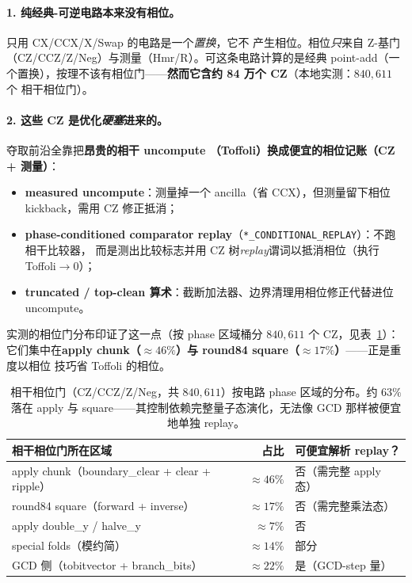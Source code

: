 \documentclass[11pt]{ctexart}
\let\c\lstinline
\begin{document}
\paragraph{1. 纯经典-可逆电路本来没有相位。}只用 CX/CCX/X/Swap 的电路是一个\emph{置换}，它不
产生相位。相位\emph{只}来自 Z-基门（CZ/CCZ/Z/Neg）与测量（Hmr/R）。可这条电路计算的是经典
point-add（一个置换），按理不该有相位门——\textbf{然而它含约 84 万个 CZ}（本地实测：$840{,}611$ 个
相干相位门）。

\paragraph{2. 这些 CZ 是优化\emph{硬塞}进来的。}夺取前沿全靠把\textbf{昂贵的相干 uncompute
（Toffoli）换成便宜的相位记账（CZ + 测量）}：
\begin{itemize}[nosep]
  \item \textbf{measured uncompute}：测量掉一个 ancilla（省 CCX），但测量留下相位 kickback，需用
  CZ 修正抵消；
  \item \textbf{phase-conditioned comparator replay}（\c{*_CONDITIONAL_REPLAY}）：不跑相干比较器，
  而是测出比较标志并用 CZ 树\emph{replay}谓词以抵消相位（执行 Toffoli$\to 0$）；
  \item \textbf{truncated / top-clean 算术}：截断加法器、边界清理用相位修正代替进位 uncompute。
\end{itemize}
实测的相位门分布印证了这一点（按 phase 区域桶分 $840{,}611$ 个 CZ，见表~\ref{tab:phasedist}）：
它们集中在\textbf{apply chunk（$\approx 46\%$）与 round84 square（$\approx 17\%$）}——正是重度以相位
技巧省 Toffoli 的相位。

\begin{table}[h]\centering\small
\begin{tabular}{@{}lrl@{}}
\toprule
相干相位门所在区域 & 占比 & 可便宜解析 replay？\\ \midrule
apply chunk（boundary\_clear + clear + ripple） & $\approx 46\%$ & 否（需完整 apply 态） \\
round84 square（forward + inverse） & $\approx 17\%$ & 否（需完整乘法态） \\
apply double\_y / halve\_y & $\approx 7\%$ & 否 \\
special folds（模约简） & $\approx 14\%$ & 部分 \\
GCD 侧（tobitvector + branch\_bits） & $\approx 22\%$ & 是（GCD-step 量） \\
\bottomrule
\end{tabular}
\caption{相干相位门（CZ/CCZ/Z/Neg，共 $840{,}611$）按电路 phase 区域的分布。约 $63\%$ 落在
apply 与 square——其控制依赖完整量子态演化，无法像 GCD 那样被便宜地单独 replay。}
\label{tab:phasedist}
\end{table}
\end{document}
